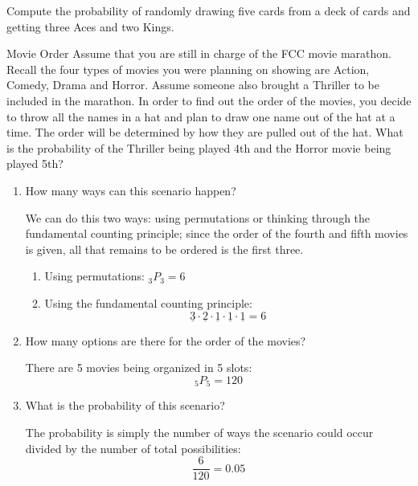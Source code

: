 \begin{try}
Compute the probability of randomly drawing five cards from a deck of cards and getting three Aces and two Kings.
\end{try}

\begin{example}[https://www.youtube.com/watch?v=vG46K6Fr8Yw]{Movie Order}
Assume that you are still in charge of the FCC movie marathon. Recall the
four types of movies you were planning on showing are Action, Comedy, Drama and Horror.
Assume someone also brought a Thriller to be included in the marathon. In order to find
out the order of the movies, you decide to throw all the names in a hat and plan to draw one
name out of the hat at a time. The order will be determined by how they are pulled out of
the hat. What is the probability of the Thriller being played 4th and the Horror movie being
played 5th?

\sol
\begin{enumerate}
\item How many ways can this scenario happen?

We can do this two ways: using permutations or thinking through the fundamental counting principle; since the order of the fourth and fifth movies is given, all that remains to be ordered is the first three.
\begin{enumerate}
\item Using permutations: $_3P_3 = 6$
\item Using the fundamental counting principle:
\[\underline{3} \cdot \underline{2} \cdot \underline{1} \cdot \underline{1} \cdot \underline{1} = 6\]
\end{enumerate}

\item How many options are there for the order of the movies?

There are 5 movies being organized in 5 slots: \[_5P_5 = 120\]

\item What is the probability of this scenario?

The probability is simply the number of ways the scenario could occur divided by the number of total possibilities:
\[\boxed{\dfrac{6}{120} = 0.05}\]
\end{enumerate}
\end{example}